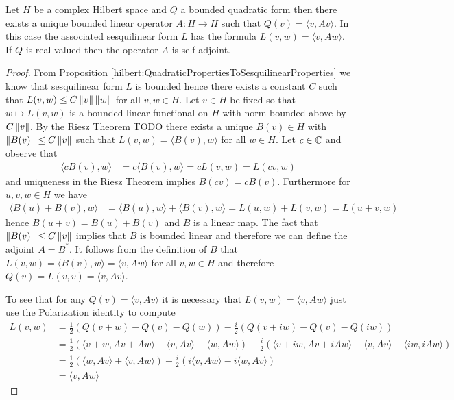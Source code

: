 \begin{prop}\label{hilbert:OperatorFromQuadraticForm}Let $H$ be a complex Hilbert space and $Q$ a bounded quadratic form then there exists a unique bounded linear operator $A : H \to H$ such that $Q(v) = \langle v, A v \rangle$.  In this case the associated sesquilinear form $L$ has the formula $L(v,w) = \langle v, A w \rangle$.  If $Q$ is real valued then the operator $A$ is self adjoint.
\end{prop}
\begin{proof}
From Proposition \ref{hilbert:QuadraticPropertiesToSesquilinearProperties} we know that sesquilinear form $L$ is bounded hence there exists a constant $C$ such that $L(v,w) \leq C \left \lVert v \right \rVert\left \lVert w \right \rVert$ for all $v,w \in H$.  Let $v \in H$ be fixed so that $w \mapsto L(v,w)$ is a bounded linear functional on $H$ with norm bounded above by $C \left \lVert v \right \rVert$.  By the Riesz Theorem TODO there exists a unique $B(v) \in H$ with $\left \lVert B(v) \right \rVert \leq C \left \lVert v \right \rVert$ such that $L(v,w) = \langle B(v), w \rangle$ for all $w \in H$.  Let $c \in \mathbb{C}$ and observe that 
\begin{align*}
\langle c B(v), w \rangle &= \overline{c} \langle B(v), w \rangle = \overline{c} L(v,w) = L(cv, w)
\end{align*}
and uniqueness in the Riesz Theorem implies $B(cv) = cB(v)$.  Furthermore for $u,v, w \in H$ we have 
\begin{align*}
\langle  B(u) + B(v), w \rangle &= \langle  B(u), w \rangle  + \langle B(v), w \rangle = L(u,w) + L(v,w) = L(u+v, w)
\end{align*}
hence $B(u+v) = B(u) + B(v)$ and $B$ is a linear map.  The fact that $\left \lVert B(v) \right \rVert \leq C \left \lVert v \right \rVert$ implies that $B$ is bounded linear and therefore we can define the adjoint $A = B^*$.  It follows from the definition of $B$ that $L(v,w) = \langle B(v) , w \rangle = \langle v, A w \rangle$ for all $v,w \in H$ and therefore $Q(v) = L(v,v) = \langle v, A v \rangle$.  

To see that for any $Q(v) = \langle v, A v \rangle$ it is necessary that $L(v,w) = \langle v, Aw \rangle$ just use the Polarization identity to compute
\begin{align*}
L(v,w) &= \frac{1}{2} \left ( Q(v+w) - Q(v) - Q(w) \right) - \frac{i}{2} \left (Q(v+iw) - Q(v) - Q(iw) \right) \\
&=\frac{1}{2} \left ( \langle v+w, Av + Aw \rangle - \langle v, Av \rangle - \langle w, A w \rangle \right) - \frac{i}{2} \left ( \langle v+iw, Av + i Aw \rangle - \langle v, A v \rangle - \langle iw, i A w \rangle \right)  \\
&=\frac{1}{2} \left ( \langle w, Av \rangle + \langle v, Aw \rangle \right) - \frac{i}{2} \left ( i \langle v, Aw \rangle -  i \langle w, A v \rangle \right) \\
&= \langle v, Aw \rangle
\end{align*}


\end{proof}
